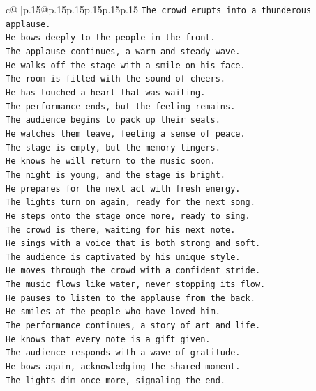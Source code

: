 \documentclass{article}
\begin{document}
{\begin{supertabular}{c@{$\;$}|p{.15\linewidth}@{}p{.15\linewidth}p{.15\linewidth}p{.15\linewidth}p{.15\linewidth}p{.15\linewidth}}
{{{\texttt{The crowd erupts into a thunderous applause.} \\
\texttt{He bows deeply to the people in the front.} \\
\texttt{The applause continues, a warm and steady wave.} \\
\texttt{He walks off the stage with a smile on his face.} \\
\texttt{The room is filled with the sound of cheers.} \\
\texttt{He has touched a heart that was waiting.} \\
\texttt{The performance ends, but the feeling remains.} \\
\texttt{The audience begins to pack up their seats.} \\
\texttt{He watches them leave, feeling a sense of peace.} \\
\texttt{The stage is empty, but the memory lingers.} \\
\texttt{He knows he will return to the music soon.} \\
\texttt{The night is young, and the stage is bright.} \\
\texttt{He prepares for the next act with fresh energy.} \\
\texttt{The lights turn on again, ready for the next song.} \\
\texttt{He steps onto the stage once more, ready to sing.} \\
\texttt{The crowd is there, waiting for his next note.} \\
\texttt{He sings with a voice that is both strong and soft.} \\
\texttt{The audience is captivated by his unique style.} \\
\texttt{He moves through the crowd with a confident stride.} \\
\texttt{The music flows like water, never stopping its flow.} \\
\texttt{He pauses to listen to the applause from the back.} \\
\texttt{He smiles at the people who have loved him.} \\
\texttt{The performance continues, a story of art and life.} \\
\texttt{He knows that every note is a gift given.} \\
\texttt{The audience responds with a wave of gratitude.} \\
\texttt{He bows again, acknowledging the shared moment.} \\
\texttt{The lights dim once more, signaling the end.} \\
}}}
\end{supertabular}}
\end{document}
